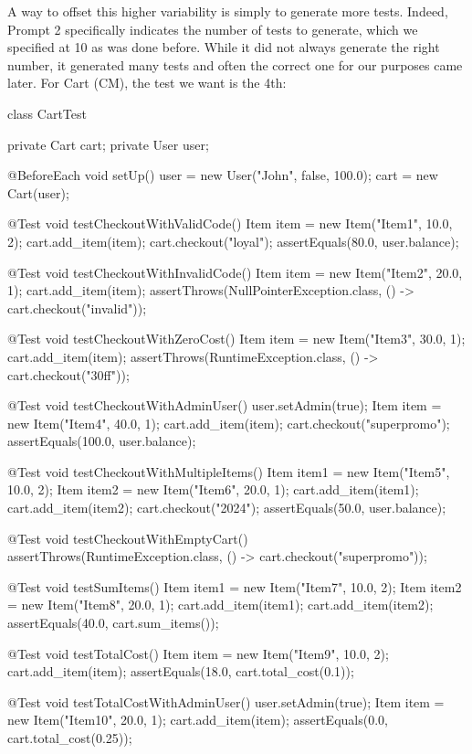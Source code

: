 A way to offset this higher variability is simply to generate more tests. Indeed, Prompt 2 specifically indicates the number of
tests to generate, which we specified at 10 as was done before. While it did not always generate the right number, it generated many
tests and often the correct one for our purposes came later. For Cart (CM), the test we want is the 4th:
\begin{response}
    class CartTest {

    private Cart cart;
    private User user;

    @BeforeEach
    void setUp() {
        user = new User("John", false, 100.0);
        cart = new Cart(user);
    }

    @Test
    void testCheckoutWithValidCode() {
        Item item = new Item("Item1", 10.0, 2);
        cart.add_item(item);
        cart.checkout("loyal");
        assertEquals(80.0, user.balance);
    }

    @Test
    void testCheckoutWithInvalidCode() {
        Item item = new Item("Item2", 20.0, 1);
        cart.add_item(item);
        assertThrows(NullPointerException.class, () -> cart.checkout("invalid"));
    }

    @Test
    void testCheckoutWithZeroCost() {
        Item item = new Item("Item3", 30.0, 1);
        cart.add_item(item);
        assertThrows(RuntimeException.class, () -> cart.checkout("30ff"));
    }

    @Test
    void testCheckoutWithAdminUser() {
        user.setAdmin(true);
        Item item = new Item("Item4", 40.0, 1);
        cart.add_item(item);
        cart.checkout("superpromo");
        assertEquals(100.0, user.balance);
    }

    @Test
    void testCheckoutWithMultipleItems() {
        Item item1 = new Item("Item5", 10.0, 2);
        Item item2 = new Item("Item6", 20.0, 1);
        cart.add_item(item1);
        cart.add_item(item2);
        cart.checkout("2024");
        assertEquals(50.0, user.balance);
    }

    @Test
    void testCheckoutWithEmptyCart() {
        assertThrows(RuntimeException.class, () -> cart.checkout("superpromo"));
    }

    @Test
    void testSumItems() {
        Item item1 = new Item("Item7", 10.0, 2);
        Item item2 = new Item("Item8", 20.0, 1);
        cart.add_item(item1);
        cart.add_item(item2);
        assertEquals(40.0, cart.sum_items());
    }

    @Test
    void testTotalCost() {
        Item item = new Item("Item9", 10.0, 2);
        cart.add_item(item);
        assertEquals(18.0, cart.total_cost(0.1));
    }

    @Test
    void testTotalCostWithAdminUser() {
        user.setAdmin(true);
        Item item = new Item("Item10", 20.0, 1);
        cart.add_item(item);
        assertEquals(0.0, cart.total_cost(0.25));
    }
}
\end{response}

